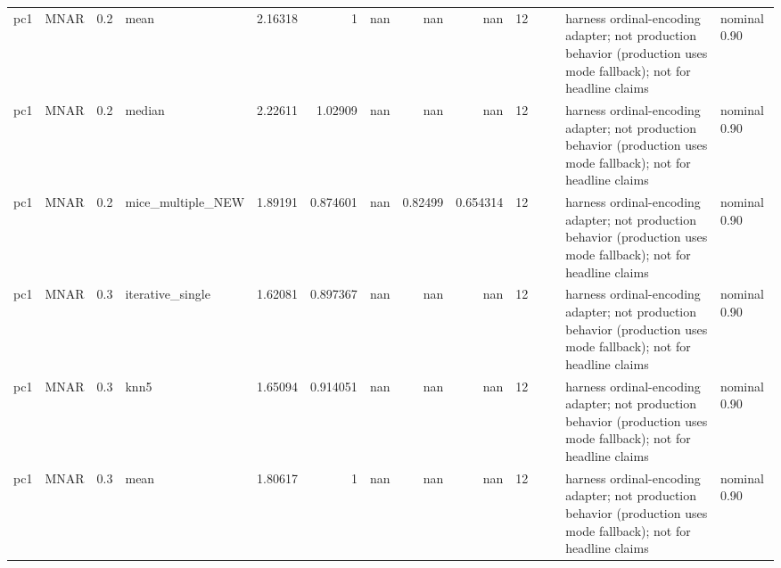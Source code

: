 \begin{table}[ht]
\begin{tabular}{llrlrrrrrrllll}
 pc1                  & MNAR        &         0.2 & mean              &       2.16318  &             1        &               nan        &                     nan        &                       nan        &        12 &                    &                                         & harness ordinal-encoding adapter; not production behavior (production uses mode fallback); not for headline claims & nominal 0.90              \\
 pc1                  & MNAR        &         0.2 & median            &       2.22611  &             1.02909  &               nan        &                     nan        &                       nan        &        12 &                    &                                         & harness ordinal-encoding adapter; not production behavior (production uses mode fallback); not for headline claims & nominal 0.90              \\
 pc1                  & MNAR        &         0.2 & mice\_multiple\_NEW &       1.89191  &             0.874601 &               nan        &                       0.82499  &                         0.654314 &        12 &                    &                                         & harness ordinal-encoding adapter; not production behavior (production uses mode fallback); not for headline claims & nominal 0.90              \\
 pc1                  & MNAR        &         0.3 & iterative\_single  &       1.62081  &             0.897367 &               nan        &                     nan        &                       nan        &        12 &                    &                                         & harness ordinal-encoding adapter; not production behavior (production uses mode fallback); not for headline claims & nominal 0.90              \\
 pc1                  & MNAR        &         0.3 & knn5              &       1.65094  &             0.914051 &               nan        &                     nan        &                       nan        &        12 &                    &                                         & harness ordinal-encoding adapter; not production behavior (production uses mode fallback); not for headline claims & nominal 0.90              \\
 pc1                  & MNAR        &         0.3 & mean              &       1.80617  &             1        &               nan        &                     nan        &                       nan        &        12 &                    &                                         & harness ordinal-encoding adapter; not production behavior (production uses mode fallback); not for headline claims & nominal 0.90              \\

\end{tabular}
\end{table}
